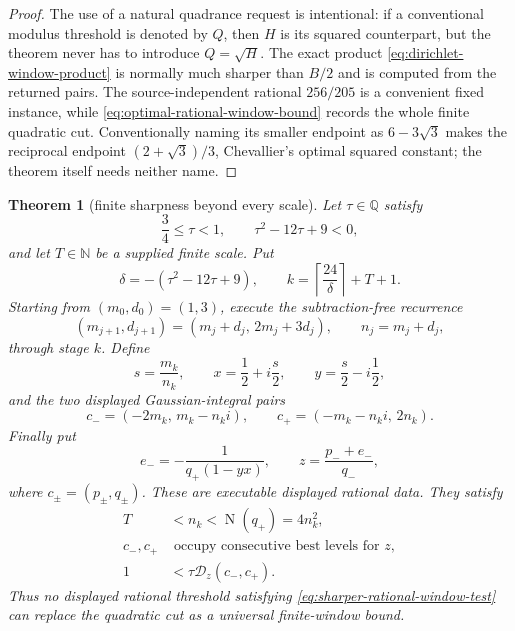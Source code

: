 \documentclass[11pt]{article}
\newtheorem{theorem}{Theorem}[section]
\newcommand{\Q}{\mathbb{Q}}
\newcommand{\N}{\mathbb{N}}
\newcommand{\Norm}[1]{\operatorname{N}\!\left(#1\right)}
\begin{document}
\begin{proof}
The use of a natural quadrance request is intentional: if a conventional
modulus threshold is denoted by $Q$, then $H$ is its squared counterpart, but
the theorem never has to introduce $Q=\sqrt H$.  The exact product
\eqref{eq:dirichlet-window-product} is normally much sharper than $B/2$ and is
computed from the returned pairs.  The source-independent rational
$256/205$ is a convenient fixed instance, while
\eqref{eq:optimal-rational-window-bound} records the whole finite quadratic
cut.  Conventionally naming its smaller endpoint as $6-3\sqrt3$ makes the
reciprocal endpoint $(2+\sqrt3)/3$, Chevallier's optimal squared constant;
the theorem itself needs neither name.
\end{proof}

\begin{theorem}[finite sharpness beyond every scale]
\label{thm:finite-dirichlet-window-sharpness}
Let $\tau\in\Q$ satisfy
\begin{equation}
\label{eq:sharper-rational-window-test}
 \frac34\le\tau<1,
 \qquad \tau^2-12\tau+9<0,
\end{equation}
and let $T\in\N$ be a supplied finite scale.  Put
\[
 \delta=-(\tau^2-12\tau+9),
 \qquad
 k=\left\lceil\frac{24}{\delta}\right\rceil+T+1.
\]
Starting from $(m_0,d_0)=(1,3)$, execute the subtraction-free recurrence
\begin{equation}
\label{eq:critical-pell-recurrence}
 (m_{j+1},d_{j+1})
   =(m_j+d_j,\,2m_j+3d_j),
 \qquad n_j=m_j+d_j,
\end{equation}
through stage $k$.  Define
\[
 s=\frac{m_k}{n_k},
 \qquad
 x=\frac12+i\frac{s}{2},
 \qquad
 y=\frac{s}{2}-i\frac12,
\]
and the two displayed Gaussian-integral pairs
\begin{equation}
\label{eq:critical-pell-pairs}
 c_-=(-2m_k,\,m_k-n_ki),
 \qquad
 c_+=(-m_k-n_ki,\,2n_k).
\end{equation}
Finally put
\begin{equation}
\label{eq:critical-pell-source}
 e_-=-\frac{1}{q_+(1-yx)},
 \qquad
 z=\frac{p_-+e_-}{q_-},
\end{equation}
where $c_\pm=(p_\pm,q_\pm)$.  These are executable displayed rational
data.  They satisfy
\begin{equation}
\label{eq:finite-window-sharpness-conclusion}
 \begin{aligned}
  T&<n_k<\Norm{q_+}=4n_k^2,\\
  c_-,c_+&\text{ occupy consecutive best levels for }z,\\
  1&<\tau\mathcal D_z(c_-,c_+).
 \end{aligned}
\end{equation}
Thus no displayed rational threshold satisfying
\eqref{eq:sharper-rational-window-test} can replace the quadratic cut as a
universal finite-window bound.
\end{theorem}
\end{document}

